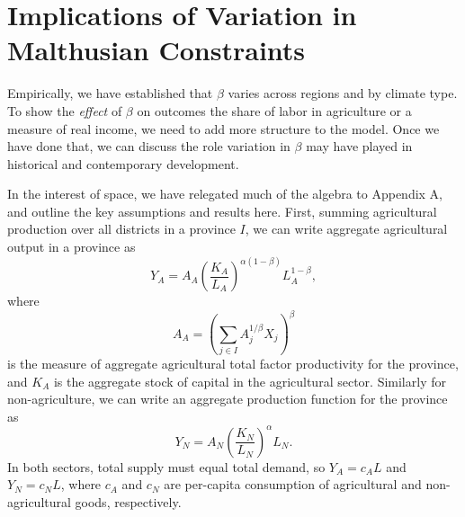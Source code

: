 \documentclass[11pt]{article}
\begin{document}
\section{Implications of Variation in Malthusian Constraints}\label{SEC_implications}
Empirically, we have established that $\beta$ varies across regions and by climate type. To show the \textit{effect} of $\beta$ on outcomes the share of labor in agriculture or a measure of real income, we need to add more structure to the model. Once we have done that, we can discuss the role variation in $\beta$ may have played in historical and contemporary development.

In the interest of space, we have relegated much of the algebra to Appendix A, and outline the key assumptions and results here. First, summing agricultural production over all districts in a province $I$, we can write aggregate agricultural output in a province as
\begin{equation}
    Y_A = A_A \left(\frac{K_A}{L_A}\right)^{\alpha(1-\beta)} L_A^{1-\beta}, \label{EQ_caL_solve}
\end{equation}
where 
\begin{equation}
    A_A = \left(\sum_{j\in I} A_{j}^{1/\beta}X_{j} \right)^\beta \nonumber
\end{equation}
is the measure of aggregate agricultural total factor productivity for the province, and $K_A$ is the aggregate stock of capital in the agricultural sector. Similarly for non-agriculture, we can write an aggregate production function for the province as
\begin{equation}
    Y_N = A_N \left(\frac{K_N}{L_N}\right)^{\alpha} L_N. \label{EQ_YN}
\end{equation}
In both sectors, total supply must equal total demand, so $Y_A = c_A L$ and $Y_N = c_N L$, where $c_A$ and $c_N$ are per-capita consumption of agricultural and non-agricultural goods, respectively.
\end{document}
